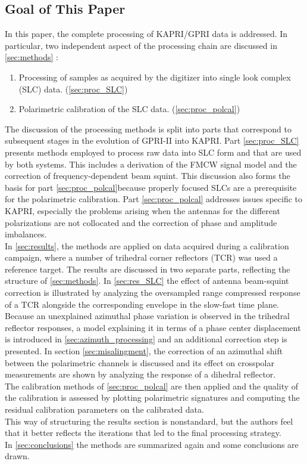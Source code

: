 \subsection{Goal of This Paper}
In this paper, the complete processing of KAPRI/GPRI data is addressed. In particular, two independent aspect of the processing chain are discussed in \autoref{sec:methods} :
\begin{enumerate}
	\item Processing of samples as acquired by the digitizer into single look complex (SLC) data. (\autoref{sec:proc_SLC})
	\item Polarimetric calibration of the SLC data. (\autoref{sec:proc_polcal})
\end{enumerate}
The discussion of the processing methods is split into parts that correspond to subsequent stages in the evolution of GPRI-II into KAPRI. Part \ref{sec:proc_SLC} presents  methods employed to process raw data into SLC form and that are used by both systems. This includes a derivation of the FMCW signal model and the correction of frequency-dependent beam squint. This discussion also forms the basis for part \ref{sec:proc_polcal}because properly focused SLCs  are a prerequisite for the polarimetric calibration. Part \ref{sec:proc_polcal} addresses issues specific to KAPRI, especially the problems arising when the antennas for the different polarizations are not collocated and the correction of phase and amplitude imbalances.\\
In \autoref{sec:results}, the methods are applied on data acquired during a calibration campaign, where a number of trihedral corner reflectors (TCR) was used a reference target. The results are discussed in two separate parts, reflecting the structure of \autoref{sec:methods}. In \autoref{sec:res_SLC} the effect of antenna beam-squint correction is illustrated by analyzing the oversampled range compressed response of a TCR alongside the corresponding envelope in the slow-fast time plane. Because an unexplained azimuthal phase variation is observed in the trihedral reflector responses, a model explaining it in terms of a phase center displacement is introduced in \autoref{sec:azimuth_processing} and an additional correction step is presented. In section \ref{sec:misalingment}, the correction of an azimuthal shift between the polarimetric channels is discussed and its effect on crosspolar measurements are shown by analyzing the response of a dihedral reflector.\\
The calibration methods of \ref{sec:proc_polcal} are then applied  and the quality of the calibration is assessed by plotting polarimetric signatures and computing the residual calibration parameters on the calibrated data.\\ This way of structuring the results section is nonstandard, but the authors feel that it better reflects the iterations that led to the final processing strategy.\\
In \autoref{sec:conclusions} the methods are summarized again and some conclusions are drawn.